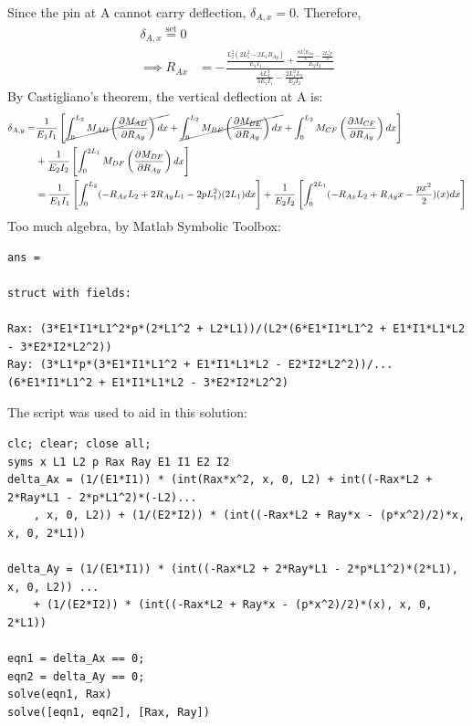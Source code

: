 Since the pin at A cannot carry deflection, $\delta_{A,x} = 0$. Therefore,
\begin{align*}
    \delta_{A,x} \overset{\text{set}}{=} 0 \\
    \implies R_{Ax} &= -\frac{\frac{L_{2}^2 (2 L_{1}^2 - 2L_1 R_{Ay})}{E_1 I_1} + \frac{\frac{8L_{1}^3 R_{Ay}}{3} - \frac{2L_{1}^4 p}{3}}{E_2 I_2}}
    {\frac{4L_{2}^3}{3 E_1 I_1} - \frac{2L_{1}^2 L_{2}}{E_2 I_2}} 
\end{align*}
By Castigliano's theorem, the vertical deflection at A is:
\begin{align*}
    \delta_{A, y} = &\frac{1}{E_1I_1} \left[\cancel{\int_{0}^{L_2} M_{AD} \left(\frac{\partial M_{AD}}{\partial R_{Ay}}\right) dx}
    + \cancel{\int_{0}^{L_2} M_{BE} \left(\frac{\partial M_{BE}}{\partial R_{Ay}}\right) dx}
    + \int_{0}^{L_2} M_{CF} \left(\frac{\partial M_{CF}}{\partial R_{Ay}}\right) dx
    \right] \\
    &+ \frac{1}{E_2I_2} \left[\int_{0}^{2 L_1} M_{DF} \left(\frac{\partial M_{DF}}{\partial R_{Ay}}\right) dx \right] \\
    &= \frac{1}{E_1I_1} \left[\int_{0}^{L_2} (-R_{Ax}L_2 + 2R_{Ay}L_1 - 2pL_1^2)(2L_1) dx \right]
    + \frac{1}{E_2I_2} \left[\int_{0}^{2 L_1} (-R_{Ax}L_2 + R_{Ay}x - \frac{px^2}{2})(x) dx \right] 
\end{align*}
Too much algebra, by Matlab Symbolic Toolbox:
\begin{verbatim}
ans = 

struct with fields:

Rax: (3*E1*I1*L1^2*p*(2*L1^2 + L2*L1))/(L2*(6*E1*I1*L1^2 + E1*I1*L1*L2 - 3*E2*I2*L2^2))
Ray: (3*L1*p*(3*E1*I1*L1^2 + E1*I1*L1*L2 - E2*I2*L2^2))/...
(6*E1*I1*L1^2 + E1*I1*L1*L2 - 3*E2*I2*L2^2)
\end{verbatim}
The script was used to aid in this solution:
\begin{verbatim}
clc; clear; close all;
syms x L1 L2 p Rax Ray E1 I1 E2 I2
delta_Ax = (1/(E1*I1)) * (int(Rax*x^2, x, 0, L2) + int((-Rax*L2 + 2*Ray*L1 - 2*p*L1^2)*(-L2)...
    , x, 0, L2)) + (1/(E2*I2)) * (int((-Rax*L2 + Ray*x - (p*x^2)/2)*x, x, 0, 2*L1))

delta_Ay = (1/(E1*I1)) * (int((-Rax*L2 + 2*Ray*L1 - 2*p*L1^2)*(2*L1), x, 0, L2)) ...
    + (1/(E2*I2)) * (int((-Rax*L2 + Ray*x - (p*x^2)/2)*(x), x, 0, 2*L1))

eqn1 = delta_Ax == 0;
eqn2 = delta_Ay == 0;
solve(eqn1, Rax)
solve([eqn1, eqn2], [Rax, Ray])
\end{verbatim}